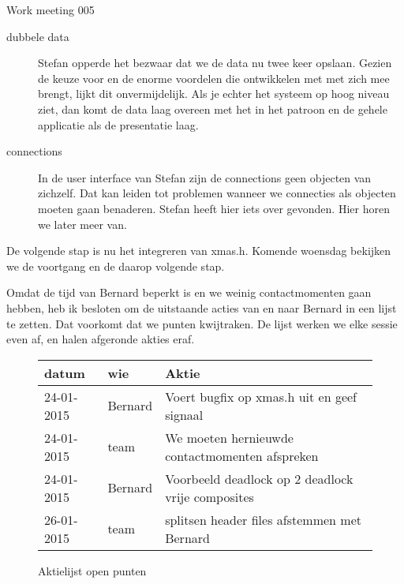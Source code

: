 \documentclass[a4paper,final]{article}
\begin{document}
\begin{Minutes}{Work meeting 005}
\begin{description}
	\item[dubbele data] Stefan opperde het bezwaar dat we de data nu twee
	keer opslaan. Gezien de keuze voor  en de enorme voordelen die ontwikkelen
	met  met zich mee brengt, lijkt dit onvermijdelijk. Als je echter
	het systeem op hoog niveau ziet, dan komt de data laag overeen met het 
	in het  patroon en de gehele  applicatie als de presentatie laag.
	
	\item[connections] In de user interface van Stefan zijn de connections geen
	objecten van zichzelf. Dat kan leiden tot problemen wanneer we connecties als
	objecten moeten gaan benaderen. Stefan heeft hier iets over gevonden. Hier horen
	we later meer van.
	
\end{description}

De volgende stap is nu het integreren van xmas.h. Komende woensdag bekijken we de voortgang
en de daarop volgende stap.


Omdat de tijd van Bernard beperkt is en we weinig contactmomenten gaan hebben, heb ik
besloten om de uitstaande acties van en naar Bernard in een lijst te zetten.
Dat voorkomt dat we punten kwijtraken. De lijst werken we elke sessie even af, 
en halen afgeronde akties eraf.

\begin{figure}
\begin{tabular}{|l|l|l|}
\hline
{\bf datum} & {\bf wie} & {\bf Aktie}\\\hline
24-01-2015  & Bernard   & Voert bugfix op xmas.h uit en geef signaal\\\hline
24-01-2015  & team      & We moeten hernieuwde contactmomenten afspreken\\\hline
24-01-2015  & Bernard   & Voorbeeld deadlock op 2 deadlock vrije composites\\\hline
26-01-2015  & team      & splitsen header files afstemmen met Bernard\\\hline
\end{tabular}
\caption{Aktielijst open punten}
\end{figure}

\end{Minutes}
\end{document}
